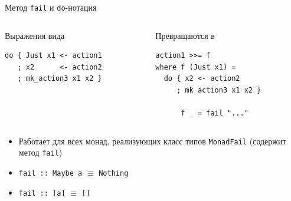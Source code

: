 \documentclass{beamer}
\newcommand{\hs}[1]{\texttt{#1}}
\begin{document}
\begin{frame}[fragile]{Метод \texttt{fail} и \texttt{do}-нотация}
    \begin{columns}
    \begin{column}{0.5\textwidth}
      \begin{block}{Выражения вида}
      
      \begin{verbatim}
do { Just x1 <- action1
   ; x2      <- action2
   ; mk_action3 x1 x2 }
      \end{verbatim}
      \end{block}
    \end{column}
    \begin{column}{0.5\textwidth}
      \begin{block}{Превращаются в}
      
      \begin{verbatim}
action1 >>= f
where f (Just x1) = 
  do { x2 <- action2
     ; mk_action3 x1 x2 }
      
      f _ = fail "..."
      \end{verbatim}
      \end{block}
    \end{column}
    \end{columns}
    \begin{itemize}
        \item Работает для всех монад, реализующих класс типов \texttt{MonadFail} (содержит метод \texttt{fail})
        \item \hs{fail :: Maybe a} $\equiv$ \hs{Nothing}
        \item \hs{fail :: [a]} $\equiv$ \hs{[]}
    \end{itemize}
\end{frame}
\end{document}
